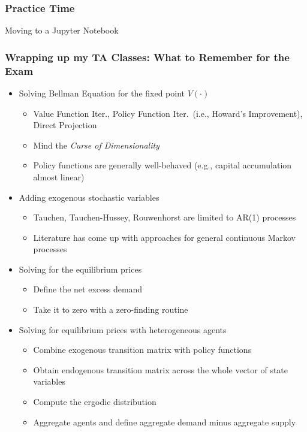 \documentclass[10pt, aspectratio=1610, natbib, handout]{beamer}
\begin{document}
  \begin{frame}
    \frametitle{Practice Time}

    Moving to a Jupyter Notebook

  \end{frame}

  \begin{frame}
    \frametitle{Wrapping up my TA Classes: What to Remember for the Exam}

    \begin{itemize}
      \item Solving Bellman Equation for the fixed point $V(\cdot)$
        \begin{itemize}
          \item Value Function Iter., Policy Function Iter.~(i.e., Howard's Improvement), Direct Projection
          \item Mind the \textit{Curse of Dimensionality}
          \item Policy functions are generally well-behaved (e.g., capital accumulation almost linear)
        \end{itemize}
      \vfill\pause
      \item Adding exogenous stochastic variables
        \begin{itemize}
          \item Tauchen, Tauchen-Hussey, Rouwenhorst are limited to AR(1) processes
          \item Literature has come up with approaches for general continuous Markov processes
        \end{itemize}
      \vfill\pause
      \item Solving for the equilibrium prices
        \begin{itemize}
          \item Define the net excess demand
          \item Take it to zero with a zero-finding routine
        \end{itemize}
      \vfill\pause
      \item Solving for equilibrium prices with heterogeneous agents
        \begin{itemize}
          \item Combine exogenous transition matrix with policy functions
          \item Obtain endogenous transition matrix across the whole vector of state variables
          \item Compute the ergodic distribution
          \item Aggregate agents and define aggregate demand minus aggregate supply

\end{itemize}
\end{itemize}
\end{frame}
\end{document}
